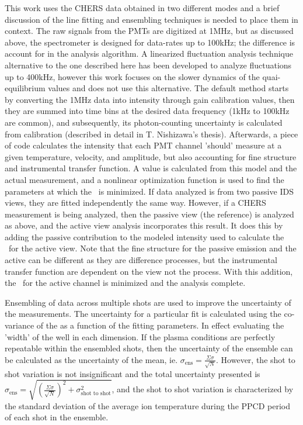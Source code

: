 This work uses the CHERS data obtained in two different modes and a brief discussion of the line fitting and ensembling techniques is needed to place them in context. The raw signals from the PMTs are digitized at 1MHz, but as discussed above, the spectrometer is designed for data-rates up to 100kHz; the difference is account for in the analysis algorithm. A linearized fluctuation analysis technique alternative to the one described here has been developed to analyze fluctuations up to 400kHz\cite{Nishizawa2017}, however this work focuses on the slower dynamics of the quai-equilibrium values and does not use this alternative. The default method starts by converting the 1MHz data into intensity through gain calibration values, then they are summed into time bins at the desired data frequency (1kHz to 100kHz are common), and subsequently, its photon-counting uncertainty is calculated from calibration (described in detail in T. Nishizawa's thesis\cite{Nishizawa2018}). Afterwards, a piece of code calculates the intensity that each PMT channel 'should' measure at a given temperature, velocity, and amplitude, but also accounting for fine structure and instrumental transfer function. A \chisq value is calculated from this model and the actual measurement, and a nonlinear optimization function is used to find the parameters at which the \chisq\ is minimized. If data analyzed is from two passive IDS views, they are fitted independently the same way. However, if a CHERS measurement is being analyzed, then the passive view (the reference) is analyzed as above, and the active view analysis incorporates this result. It does this by adding the passive contribution to the modeled intensity used to calculate the \chisq\ for the active view. Note that the fine structure for the passive emission and the active can be different as they are difference processes, but the instrumental transfer function are dependent on the view not the process. With this addition, the \chisq\ for the active channel is minimized and the analysis complete.

Ensembling of data across multiple shots are used to improve the uncertainty of the measurements. The uncertainty for a particular fit is calculated using the co-variance of the \chisq as a function of the fitting parameters. In effect evaluating the 'width' of the \chisq well in each dimension. If the plasma conditions are perfectly repeatable within the ensembled shots, then the uncertainty of the ensemble can be calculated as the uncertainty of the mean, ie. $\sigma_{\text{ens}} = \frac{\Sigma \sigma}{\sqrt{N}}$. However, the shot to shot variation is not insignificant and the total uncertainty presented is $\sigma_{\text{ens}} = \sqrt{ (\frac{\Sigma \sigma}{\sqrt{N}})^2 + \sigma_{\text{shot to shot}}^2}$, and the shot to shot variation is characterized by the standard deviation of the average ion temperature during the PPCD period of each shot in the ensemble.

